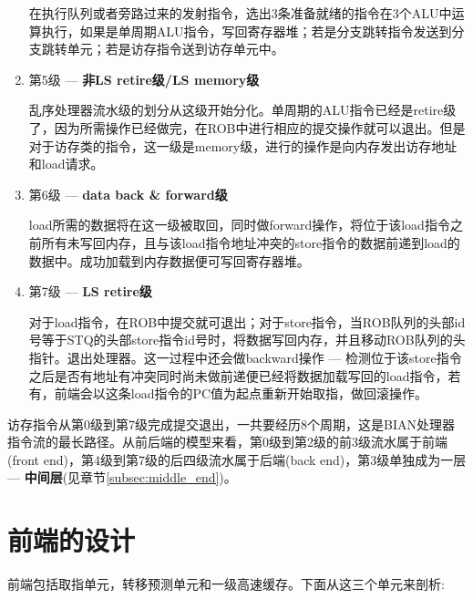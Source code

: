 \begin{enumerate}[label=(\alph*)]
	在执行队列或者旁路过来的发射指令，选出3条准备就绪的指令在3个ALU中运算执行，如果是单周期ALU指令，写回寄存器堆；若是分支跳转指令发送到分支跳转单元；若是访存指令送到访存单元中。
	\item 第5级 --- \textbf{非LS retire级/LS memory级}

	乱序处理器流水级的划分从这级开始分化。单周期的ALU指令已经是retire级了，因为所需操作已经做完，在ROB中进行相应的提交操作就可以退出。但是对于访存类的指令，这一级是memory级，进行的操作是向内存发出访存地址和load请求。
	\item 第6级 --- \textbf{data back \& forward级}
	
	load所需的数据将在这一级被取回，同时做forward操作，将位于该load指令之前所有未写回内存，且与该load指令地址冲突的store指令的数据前递到load的数据中。成功加载到内存数据便可写回寄存器堆。
	\item 第7级 --- \textbf{LS retire级}
	
	对于load指令，在ROB中提交就可退出；对于store指令，当ROB队列的头部id号等于STQ的头部store指令id号时，将数据写回内存，并且移动ROB队列的头指针。退出处理器。这一过程中还会做backward操作 --- 检测位于该store指令之后是否有地址有冲突同时尚未做前递便已经将数据加载写回的load指令，若有，前端会以这条load指令的PC值为起点重新开始取指，做回滚操作。
\end{enumerate}

	访存指令从第0级到第7级完成提交退出，一共要经历8个周期，这是BIAN处理器指令流的最长路径。从前后端的模型来看，第0级到第2级的前3级流水属于前端(front end)，第4级到第7级的后四级流水属于后端(back end)，第3级单独成为一层 --- \textbf{中间层}(见章节\ref{subsec:middle_end})。
	
\section{前端的设计}\label{sec:frontend}
前端包括取指单元，转移预测单元和一级高速缓存。下面从这三个单元来剖析:
